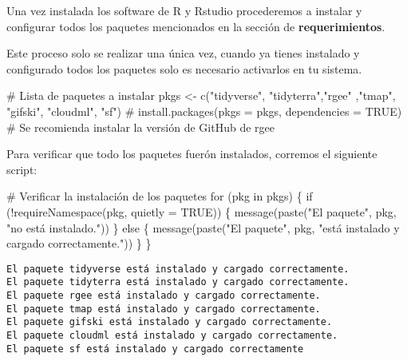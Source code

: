\documentclass[
  letterpaper,
  DIV=11,
  numbers=noendperiod]{scrreprt}
\newenvironment{Shaded}{\begin{snugshade}}{\end{snugshade}}
\newcommand{\AttributeTok}[1]{\textcolor[rgb]{0.40,0.45,0.13}{#1}}
\newcommand{\CommentTok}[1]{\textcolor[rgb]{0.37,0.37,0.37}{#1}}
\newcommand{\ConstantTok}[1]{\textcolor[rgb]{0.56,0.35,0.01}{#1}}
\newcommand{\ControlFlowTok}[1]{\textcolor[rgb]{0.00,0.23,0.31}{#1}}
\newcommand{\FunctionTok}[1]{\textcolor[rgb]{0.28,0.35,0.67}{#1}}
\newcommand{\NormalTok}[1]{\textcolor[rgb]{0.00,0.23,0.31}{#1}}
\newcommand{\OtherTok}[1]{\textcolor[rgb]{0.00,0.23,0.31}{#1}}
\newcommand{\SpecialCharTok}[1]{\textcolor[rgb]{0.37,0.37,0.37}{#1}}
\newcommand{\StringTok}[1]{\textcolor[rgb]{0.13,0.47,0.30}{#1}}
\begin{document}
Una vez instalada los software de R y Rstudio procederemos a instalar y
configurar todos los paquetes mencionados en la sección de
\textbf{requerimientos}.

Este proceso solo se realizar una única vez, cuando ya tienes instalado
y configurado todos los paquetes solo es necesario activarlos en tu
sistema.

\begin{Shaded}
\begin{Highlighting}[]
\CommentTok{\# Lista de paquetes a instalar}
\NormalTok{pkgs }\OtherTok{\textless{}{-}} \FunctionTok{c}\NormalTok{(}\StringTok{"tidyverse"}\NormalTok{, }\StringTok{"tidyterra"}\NormalTok{,}\StringTok{"rgee"}\NormalTok{ ,}\StringTok{"tmap"}\NormalTok{, }\StringTok{"gifski"}\NormalTok{, }\StringTok{"cloudml"}\NormalTok{, }\StringTok{"sf"}\NormalTok{)}
\CommentTok{\# install.packages(pkgs = pkgs, dependencies = TRUE)}
\CommentTok{\# Se recomienda instalar la versión de GitHub de rgee}
\end{Highlighting}
\end{Shaded}

Para verificar que todo los paquetes fuerón instalados, corremos el
siguiente script:

\begin{Shaded}
\begin{Highlighting}[]
\CommentTok{\# Verificar la instalación de los paquetes}
\ControlFlowTok{for}\NormalTok{ (pkg }\ControlFlowTok{in}\NormalTok{ pkgs) \{}
  \ControlFlowTok{if}\NormalTok{ (}\SpecialCharTok{!}\FunctionTok{requireNamespace}\NormalTok{(pkg, }\AttributeTok{quietly =} \ConstantTok{TRUE}\NormalTok{)) \{}
    \FunctionTok{message}\NormalTok{(}\FunctionTok{paste}\NormalTok{(}\StringTok{"El paquete"}\NormalTok{, pkg, }\StringTok{"no está instalado."}\NormalTok{))}
\NormalTok{  \} }\ControlFlowTok{else}\NormalTok{ \{}
    \FunctionTok{message}\NormalTok{(}\FunctionTok{paste}\NormalTok{(}\StringTok{"El paquete"}\NormalTok{, pkg, }\StringTok{"está instalado y cargado correctamente."}\NormalTok{))}
\NormalTok{  \}}
\NormalTok{\}}
\end{Highlighting}
\end{Shaded}

\begin{verbatim}
El paquete tidyverse está instalado y cargado correctamente.
El paquete tidyterra está instalado y cargado correctamente.
El paquete rgee está instalado y cargado correctamente.
El paquete tmap está instalado y cargado correctamente.
El paquete gifski está instalado y cargado correctamente.
El paquete cloudml está instalado y cargado correctamente.
El paquete sf está instalado y cargado correctamente
\end{verbatim}
\end{document}
